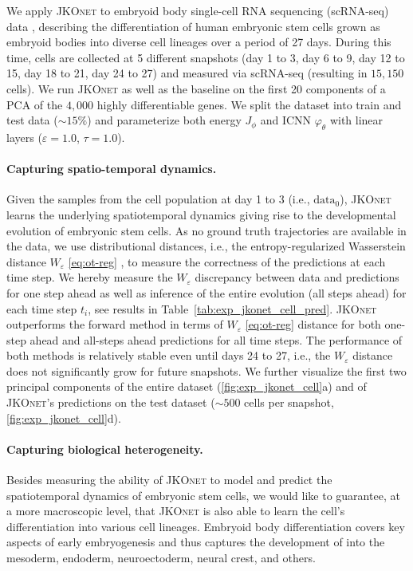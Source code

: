 We apply \textsc{JKOnet} to embryoid body single-cell RNA sequencing (scRNA-seq) data \citep{moon2019visualizing}, describing the differentiation of human embryonic stem cells grown as embryoid bodies into diverse cell lineages over a period of 27 days. During this time, cells are collected at 5 different snapshots (day 1 to 3, day 6 to 9, day 12 to 15, day 18 to 21, day 24 to 27) and measured via scRNA-seq (resulting in $15,150$ cells).
We run \textsc{JKOnet} as well as the baseline on the first 20 components of a \acrfull{PCA} of the $4,000$ highly differentiable genes.
We split the dataset into train and test data ($\sim 15 \%$) and parameterize both energy $J_\phi$ and ICNN $\varphi_\theta$ with linear layers ($\varepsilon = 1.0$, $\tau = 1.0$).

\paragraph{Capturing spatio-temporal dynamics.}
Given the samples from the cell population at day 1 to 3 (i.e., $\mathrm{data}_0$), \textsc{JKOnet} learns the underlying spatiotemporal dynamics giving rise to the developmental evolution of embryonic stem cells. 
As no ground truth trajectories are available in the data, we use distributional distances, i.e., the entropy-regularized Wasserstein distance $W_\varepsilon$ \eqref{eq:ot-reg} \citep{flamary2021pot}, to measure the correctness of the predictions at each time step.
We hereby measure the $W_\varepsilon$ discrepancy between data and predictions for one step ahead as well as inference of the entire evolution (all steps ahead) for each time step $t_i$, see results in Table~\ref{tab:exp_jkonet_cell_pred}. \textsc{JKOnet} outperforms the forward method in terms of $W_\varepsilon$ \eqref{eq:ot-reg} distance for both one-step ahead and all-steps ahead predictions for all time steps. 
The performance of both methods is relatively stable even until days 24 to 27, i.e., the $W_\varepsilon$ distance does not significantly grow for future snapshots.
We further visualize the first two principal components of the entire dataset (\cref{fig:exp_jkonet_cell}a) and of \textsc{JKOnet}'s predictions on the test dataset ($\sim 500$ cells per snapshot, \cref{fig:exp_jkonet_cell}d). 

\paragraph{Capturing biological heterogeneity.}
Besides measuring the ability of \textsc{JKOnet} to model and predict the spatiotemporal dynamics of embryonic stem cells, we would like to guarantee, at a more macroscopic level, that \textsc{JKOnet} is also able to learn the cell's differentiation into various cell lineages.
Embryoid body differentiation covers key aspects of early embryogenesis and thus captures the development of  into the mesoderm, endoderm, neuroectoderm, neural crest, and others.

